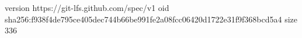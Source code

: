version https://git-lfs.github.com/spec/v1
oid sha256:f938f4de795ce405dec744b66be991fe2a08fcc06420d1722e31f9f368bcd5a4
size 336
